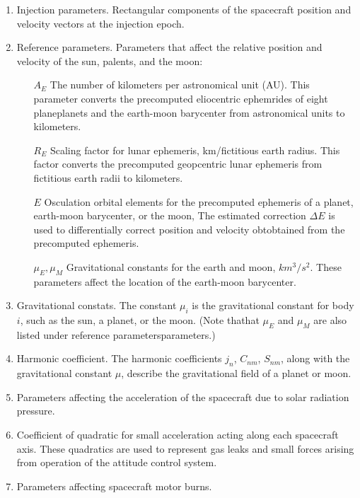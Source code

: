 \documentclass{article}
\begin{document}
\begin{multicols}{2}
  \begin{enumerate}
    \item Injection parameters. Rectangular components of the spacecraft position
      and velocity vectors at the injection epoch.
    \item Reference parameters. Parameters that affect the relative position and
      velocity of the sun, palents, and the moon:
      \begin{enumerate}
        \item[\(A_E\)] The number of kilometers per astronomical unit (AU). This
          parameter converts the precomputed eliocentric ephemrides of eight
          planeplanets and the earth-moon barycenter from astronomical units to
          kilometers.
        \item[\(R_E\)] Scaling factor for lunar ephemeris, km/fictitious earth
          radius. This factor converts the precomputed geopcentric lunar
          ephemeris from fictitious earth radii to kilometers.
        \item[\(E\)] Osculation orbital elements for the precomputed ephemeris of
          a planet, earth-moon barycenter, or the moon, The estimated correction
          \(\Delta E\) is used to differentially correct position and velocity
          obtobtained from the precomputed ephemeris.
        \item[\(\mu_E,\mu_M\)] Gravitational constants for the earth and moon,
          \(km^3/s^2\). These parameters affect the location of the earth-moon
          barycenter.
      \end{enumerate}
    \item Gravitational constats. The constant \(\mu_i\) is the gravitational
      constant for body \(i\), such as the sun, a planet, or the moon. (Note
      thathat \(\mu_E\) and \(\mu_M\) are also listed under reference
      parametersparameters.)
    \item Harmonic coefficient. The harmonic coefficients \(j_n\), \(C_{nm}\),
      \(S_{nm}\), along with the gravitational constant \(\mu\), describe the
      gravitational field of a planet or moon.
    \item Parameters affecting the acceleration of the spacecraft due to solar
      radiation pressure.
    \item Coefficient of quadratic for small acceleration acting along each
      spacecraft axis. These quadratics are used to represent gas leaks and
      small forces arising from operation of the attitude control system.
    \item Parameters affecting spacecraft motor burns.

\end{enumerate}
\end{multicols}
\end{document}
